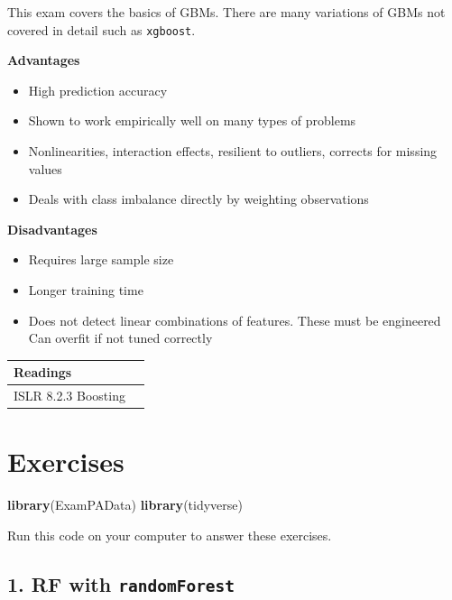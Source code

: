 \documentclass[openany]{book}
\newenvironment{Shaded}{\begin{snugshade}}{\end{snugshade}}
\newcommand{\KeywordTok}[1]{\textcolor[rgb]{0.13,0.29,0.53}{\textbf{#1}}}
\newcommand{\NormalTok}[1]{#1}
\providecommand{\tightlist}{%
  \setlength{\itemsep}{0pt}\setlength{\parskip}{0pt}}
\begin{document}
This exam covers the basics of GBMs. There are many variations of GBMs not covered in detail such as \texttt{xgboost}.

\textbf{Advantages}

\begin{itemize}
\tightlist
\item
  High prediction accuracy
\item
  Shown to work empirically well on many types of problems
\item
  Nonlinearities, interaction effects, resilient to outliers, corrects for missing values
\item
  Deals with class imbalance directly by weighting observations
\end{itemize}

\textbf{Disadvantages}

\begin{itemize}
\tightlist
\item
  Requires large sample size
\item
  Longer training time
\item
  Does not detect linear combinations of features. These must be engineered
  Can overfit if not tuned correctly
\end{itemize}

\begin{longtable}[]{@{}ll@{}}
\toprule
Readings &\tabularnewline
\midrule
\endhead
ISLR 8.2.3 Boosting &\tabularnewline
\bottomrule
\end{longtable}

\hypertarget{exercises-1}{%
\section{Exercises}\label{exercises-1}}

\begin{Shaded}
\begin{Highlighting}[]
\KeywordTok{library}\NormalTok{(ExamPAData)}
\KeywordTok{library}\NormalTok{(tidyverse)}
\end{Highlighting}
\end{Shaded}

Run this code on your computer to answer these exercises.

\hypertarget{rf-with-randomforest}{%
\subsection{\texorpdfstring{1. RF with \texttt{randomForest}}{1. RF with randomForest}}\label{rf-with-randomforest}}
\end{document}
